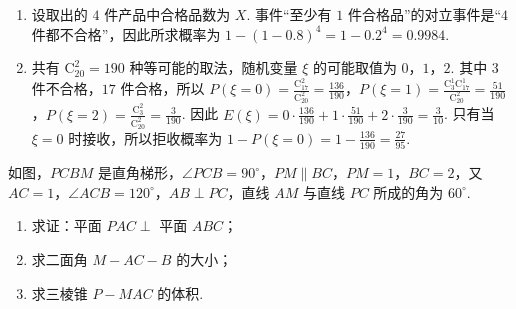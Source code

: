 \begin{solution}
\begin{enumerate}
\item 设取出的 \(4\) 件产品中合格品数为 \(X\). 事件“至少有 \(1\) 件合格品”的对立事件是“\(4\) 件都不合格”，因此所求概率为 \(1-(1-0.8)^4=1-0.2^4=0.9984\).
\item 共有 \(\mathrm C_{20}^{2}=190\) 种等可能的取法，随机变量 \(\xi\) 的可能取值为 \(0\)，\(1\)，\(2\). 其中 \(3\) 件不合格，\(17\) 件合格，所以 \(P(\xi=0)=\frac{\mathrm C_{17}^{2}}{\mathrm C_{20}^{2}}=\frac{136}{190}\)，\(P(\xi=1)=\frac{\mathrm C_{3}^{1}\mathrm C_{17}^{1}}{\mathrm C_{20}^{2}}=\frac{51}{190}\)，\(P(\xi=2)=\frac{\mathrm C_{3}^{2}}{\mathrm C_{20}^{2}}=\frac{3}{190}\).
因此 \(E(\xi)=0\cdot\frac{136}{190}+1\cdot\frac{51}{190}+2\cdot\frac{3}{190}=\frac{3}{10}\). 只有当 \(\xi=0\) 时接收，所以拒收概率为 \(1-P(\xi=0)=1-\frac{136}{190}=\frac{27}{95}\).
\end{enumerate}
\end{solution}


\begin{problem}
如图，\(PCBM\) 是直角梯形，\(\angle PCB = 90^\circ\)，\(PM \parallel BC\)，\(PM = 1\)，\(BC = 2\)，又 \(AC = 1\)，\(\angle ACB = 120^\circ\)，\(AB \perp PC\)，直线 \(AM\) 与直线 \(PC\) 所成的角为 \(60^\circ\).

\begin{enumerate}
\item 求证：平面 \(PAC \perp\) 平面 \(ABC\)；
\item 求二面角 \(M - AC - B\) 的大小；
\item 求三棱锥 \(P - MAC\) 的体积.
\end{enumerate}

\end{problem}

